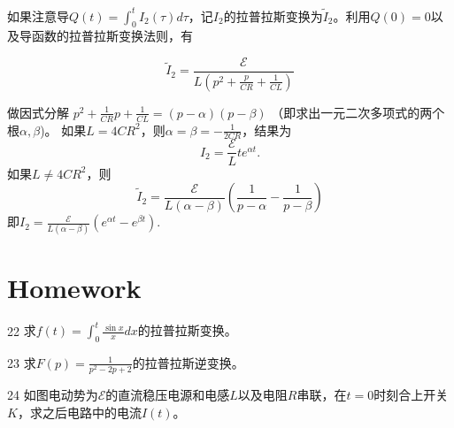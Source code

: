 \documentclass[CJK]{beamer}
\begin{document}
\begin{frame}
  \bch
  如果注意导$Q(t) = \int_0^t I_2(\tau) d\tau$，记$I_2$的拉普拉斯变换为$\tilde{I}_2$。利用$Q(0) = 0$以及导函数的拉普拉斯变换法则，有
  
  $$  \tilde{I}_2 = \frac{\mathcal{E}}{L\left(p^2+\frac{p}{CR} + \frac{1}{CL}\right)} $$

  做因式分解 $p^2 + \frac{1}{CR} p + \frac{1}{CL} = (p-\alpha)(p-\beta)$ （即求出一元二次多项式的两个根$\alpha,\beta$)。
    如果$L = 4CR^2$，则$\alpha = \beta = -\frac{1}{2CR}$，结果为 $$ I_2 = \frac{\mathcal{E}}{L}t e^{\alpha t} .$$
    如果$L \ne 4CR^2$，则
    $$\tilde{I}_2 = \frac{\mathcal{E}}{L(\alpha-\beta)} \left(\frac{1}{p-\alpha}-\frac{1}{p-\beta}\right) $$
  即$I_2 = \frac{\mathcal{E}}{L(\alpha-\beta)}\left(e^{\alpha t}- e^{\beta t}\right).$
  \ech
\end{frame}



\section{Homework}

\begin{frame}
\bch
\bitem
\item[22]{求$f(t) = \int_0^t \frac{\sin x}{x}dx$的拉普拉斯变换。}
\item[23]{求$F(p) = \frac{1}{p^2-2p+2}$的拉普拉斯逆变换。}
\item[24]{如图电动势为$\mathcal{E}$的直流稳压电源和电感$L$以及电阻$R$串联，在$t=0$时刻合上开关$K$，求之后电路中的电流$I(t)$。
}
  \eitem
\ech
\end{frame}
\end{document}
